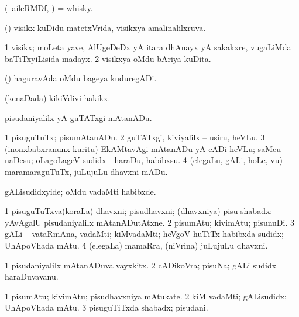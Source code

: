 \bentry
{} 
\gl{\nA}
\bmng
(\kanmu\ aileRMDf, \ame) = \hyperlink{whisky(1)}{whisky}. 
\emng
\eentry

\bentry
{} 
\gl{\gu}
\expl{}
\bmng
(\hA) visikx kuDidu matetxVrida, visikxya amalinalilxruva. 
\emng
\eentry

\bentry
{} 
\gl{\nA}
\bmng
\bnum
\num{1} visikx; moLeta yave, AlUgeDeDx yA itara dhAnayx yA sakakxre, \mo vugaLiMda baTiTxyiLisida madayx. 
\num{2} visikxya oMdu bAriya kuDita. 
\enum
\emng
\eentry

\bentry
{} 
\gl{\nA}
\bmng
(\ca) haguravAda oMdu bageya kuduregADi. 
\emng
\eentry

\bentry
{}
\gl{\nA}
\bmng
(kenaDada) kikiVdivi hakikx. 
\emng
\eentry

\bentry
{} 
\gl{\sakirx}
\expl{}
\bmng
pisudaniyalilx yA guTATxgi mAtanADu. 
\emng

\noindent
\gl{\akirx}
\bmng
\bnum
\num{1} pisuguTuTx; pisumAtanADu. 
\num{2} guTATxgi, kiviyalilx -- usiru, heVLu. 
\num{3} (inonxbabxranunx kuritu) EkAMtavAgi mAtanADu yA cADi heVLu; saMcu naDesu; oLagoLageV sudidx - haraDu, habibxsu. 
\num{4} (elegaLu, gALi, hoLe, \mo vu) maramaraguTuTx, juLujuLu dhavxni mADu. 
\enum
\emng

\noindent
\gl{\pagu}
\bmng
{} gALisudidxyide; oMdu vadaMti habibxde. 
\emng
\eentry

\bentry
{} 
\gl{\nA}
\expl{}
\bmng
\bnum
\num{1} pisuguTuTxva(koraLa) dhavxni; pisudhavxni; (dhavxniya) pisu shabadx:  yAvAgalU pisudaniyalilx mAtanADutAtxne. 
\num{2} pisumAtu; kivimAtu; pisunuDi. 
\num{3} gALi -- vataRmAna, vadaMti; kiMvadaMti; heVgoV huTiTx habibxda sudidx; UhApoVhada mAtu. 
\num{4} (elegaLa) mamaRra, (niVrina) juLujuLu dhavxni. 
\enum
\emng
\eentry

\bentry
{} 
\gl{\nA}
\expl{}
\bmng
\bnum
\num{1} pisudaniyalilx mAtanADuva vayxkitx. 
\num{2} cADikoVra; pisuNa; gALi sudidx haraDuvavanu. 
\enum
\emng
\eentry

\bentry
{} 
\gl{\nA}
\expl{}
\bmng
\bnum
\num{1} pisumAtu; kivimAtu; pisudhavxniya mAtukate. 
\num{2} kiM vadaMti; gALisudidx; UhApoVhada mAtu. 
\num{3} pisuguTiTxda shabadx; pisudani. 
\enum
\emng

